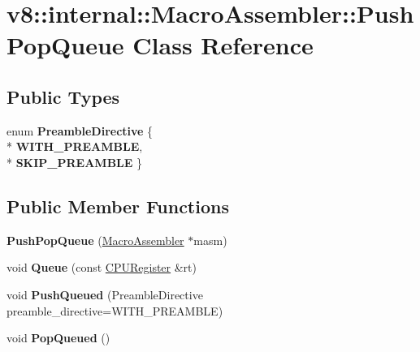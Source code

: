 \hypertarget{classv8_1_1internal_1_1_macro_assembler_1_1_push_pop_queue}{}\section{v8\+:\+:internal\+:\+:Macro\+Assembler\+:\+:Push\+Pop\+Queue Class Reference}
\label{classv8_1_1internal_1_1_macro_assembler_1_1_push_pop_queue}
\subsection*{Public Types}
\begin{DoxyCompactItemize}
\item 
enum {\bfseries Preamble\+Directive} \{ \\*
{\bfseries W\+I\+T\+H\+\_\+\+P\+R\+E\+A\+M\+B\+LE}, 
\\*
{\bfseries S\+K\+I\+P\+\_\+\+P\+R\+E\+A\+M\+B\+LE}
 \}\hypertarget{classv8_1_1internal_1_1_macro_assembler_1_1_push_pop_queue_a2dae21be7d2bdf8de8de3c5f89bfce1a}{}\label{classv8_1_1internal_1_1_macro_assembler_1_1_push_pop_queue_a2dae21be7d2bdf8de8de3c5f89bfce1a}

\end{DoxyCompactItemize}
\subsection*{Public Member Functions}
\begin{DoxyCompactItemize}
\item 
{\bfseries Push\+Pop\+Queue} (\hyperlink{classv8_1_1internal_1_1_macro_assembler}{Macro\+Assembler} $\ast$masm)\hypertarget{classv8_1_1internal_1_1_macro_assembler_1_1_push_pop_queue_a1324ad042bbe6fe7b28adb03648483b3}{}\label{classv8_1_1internal_1_1_macro_assembler_1_1_push_pop_queue_a1324ad042bbe6fe7b28adb03648483b3}

\item 
void {\bfseries Queue} (const \hyperlink{structv8_1_1internal_1_1_c_p_u_register}{C\+P\+U\+Register} \&rt)\hypertarget{classv8_1_1internal_1_1_macro_assembler_1_1_push_pop_queue_a15f821a408ba2d66324531309d3b9a77}{}\label{classv8_1_1internal_1_1_macro_assembler_1_1_push_pop_queue_a15f821a408ba2d66324531309d3b9a77}

\item 
void {\bfseries Push\+Queued} (Preamble\+Directive preamble\+\_\+directive=W\+I\+T\+H\+\_\+\+P\+R\+E\+A\+M\+B\+LE)\hypertarget{classv8_1_1internal_1_1_macro_assembler_1_1_push_pop_queue_a169cef00aed7aa89478a09decf19f68d}{}\label{classv8_1_1internal_1_1_macro_assembler_1_1_push_pop_queue_a169cef00aed7aa89478a09decf19f68d}

\item 
void {\bfseries Pop\+Queued} ()\hypertarget{classv8_1_1internal_1_1_macro_assembler_1_1_push_pop_queue_a4cd0b4ebc6a533ac64a1c03c9c67265e}{}\label{classv8_1_1internal_1_1_macro_assembler_1_1_push_pop_queue_a4cd0b4ebc6a533ac64a1c03c9c67265e}

\end{DoxyCompactItemize}
